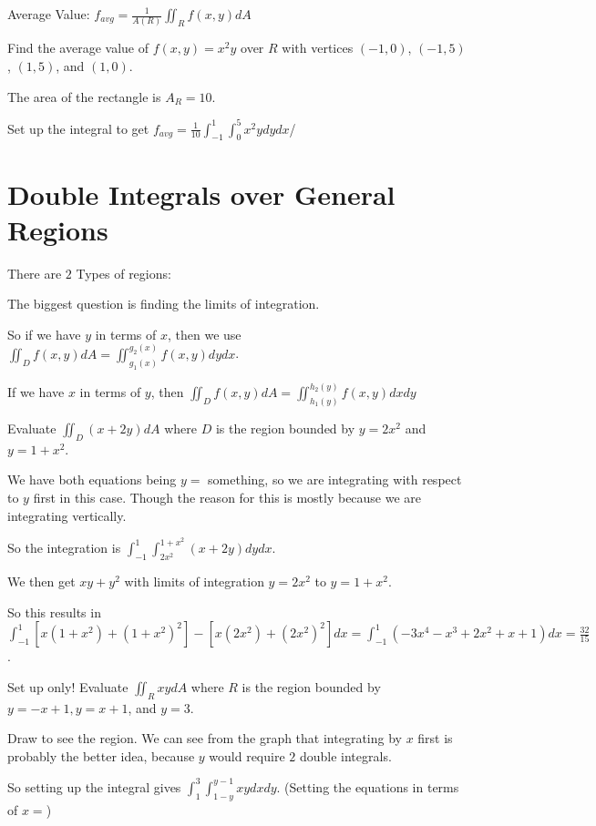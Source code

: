 \documentclass[../calc3.tex]{subfiles}
\begin{document}
Average Value: $f_{avg}=\frac{1}{A(R)}\iint_R f(x,y)dA$

\begin{example}
    Find the average value of $f(x,y)=x^2y$ over $R$ with vertices $(-1,0)$, $(-1,5)$, $(1,5)$, and $(1,0)$.

    The area of the rectangle is $A_R=10$.

    Set up the integral to get $f_{avg}=\frac{1}{10}\int_{-1}^1 \int_0^5 x^2y dydx$/
\end{example}

\section{Double Integrals over General Regions}
There are $2$ Types of regions:

The biggest question is finding the limits of integration.

So if we have $y$ in terms of $x$, then we use $\iint_D f(x,y)dA = \iint_{g_1(x)}^{g_2(x)}f(x,y)dydx$.

If we have $x$ in terms of $y$, then $\iint_D f(x,y)dA=\iint_{h_1(y)}^{h_2(y)} f(x,y)dxdy$

\begin{example}
    Evaluate $\iint_D (x+2y)dA$ where $D$ is the region bounded by $y=2x^2$ and $y=1+x^2$.

    We have both equations being $y=$ something, so we are integrating with respect to $y$ first in this case. Though the reason for this is mostly because we are integrating vertically.

    So the integration is $\int_{-1}^1 \int_{2x^2}^{1+x^2}(x+2y)dydx$.

    We then get $xy+y^2$ with limits of integration $y=2x^2$ to $y=1+x^2$.

    So this results in $\int_{-1}^1 [x(1+x^2)+(1+x^2)^2]-[x(2x^2)+(2x^2)^2]dx = \int_{-1}^1 (-3x^4-x^3+2x^2+x+1)dx = \frac{32}{15}$.
\end{example}

\begin{example}
    Set up only! Evaluate $\iint_R xydA$ where $R$ is the region bounded by $y=-x+1, y=x+1$, and $y=3$.

    Draw to see the region. We can see from the graph that integrating by $x$ first is probably the better idea, because $y$ would require $2$ double integrals.

    So setting up the integral gives $\int_1^3 \int_{1-y}^{y-1}xy dxdy$. (Setting the equations in terms of $x=$)
\end{example}
\end{document}
